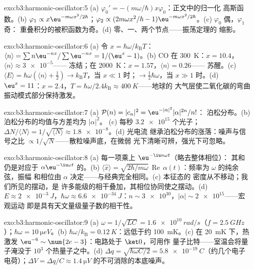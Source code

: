 \begin{solution}{exo:b3:harmonic-oscillator:5}
(a) $\varphi_0' = -(m\omega/\hbar)x\varphi_0$：正文中的归一化
高斯函数。(b) $\varphi_1 \propto x\eu^{-m\omega
x^2/2\hbar}$；$\varphi_2 \propto (2m\omega x^2/\hbar -
1)\eu^{-m\omega x^2/2\hbar}$。(c) $\varphi_0$ 偶，$\varphi_1$ 奇：
重叠积分的被积函数为奇。(d) 零、一、两个节点——振荡定理的
缩影。
\end{solution}

\begin{solution}{exo:b3:harmonic-oscillator:6}
(a) 令 $x = \hbar\omega/k_{\text{B}}T$：$\langle n\rangle =
\sum n\eu^{-nx}/\sum\eu^{-nx} = 1/(\eu^x - 1)$。(b) CO 在
\qty{300}{K}：$x = 10.4$，$\langle n\rangle \approx \num{3e-5}$——
冻结；在 \qty{2000}{K}：$x = 1.57$，$\langle n\rangle = 0.26$——
苏醒。(c) $\langle E\rangle = \hbar\omega(\langle n\rangle +
\tfrac12) \to k_{\text{B}}T$，当 $x \ll 1$ 时；$\to \tfrac12\hbar
\omega$，当 $x \gg 1$ 时。(d) $\eu^x = 11$：$x = 2.4$，$T =
\hbar\omega/2.4k_{\text{B}} \approx \qty{400}{K}$——地球的
大气层使二氧化碳的弯曲振动模式部分保持激发。
\end{solution}

\begin{solution}{exo:b3:harmonic-oscillator:7}
(a) $\mathcal P(n) = |c_n|^2 = \eu^{-|\alpha|^2}|\alpha|^{2n}/n!$：
泊松分布。(b) 泊松分布的均值与方差均为 $|\alpha|^2$。
(c) 每秒 $\num{3.2e15}$ 个光子；$\Delta N/\langle N\rangle =
1/\sqrt{\langle N\rangle} \approx \num{1.8e-8}$。(d) 光电流
继承泊松分布的涨落：噪声与信号之比
$\propto 1/\sqrt N$——散粒噪声底，在微弱
光下清晰可辨，强光下可忽略。
\end{solution}

\begin{solution}{exo:b3:harmonic-oscillator:8}
(a) 每一项乘上 $\eu^{-\iu n\omega t}$（略去整体相位）：
其和仍是对应于 $\alpha\eu^{-\iu\omega t}$ 的。(b)
$\langle\hat x\rangle = \sqrt{2\hbar/m\omega}\,
\operatorname{Re}\,\alpha(t)$：频率为 $\omega$ 的纯余弦，振幅
和相位由 $\alpha$ 决定——与经典完全相同。(c) 本征态的
密度从不移动；我们所见的摆动，是
许多能级的相干叠加，其相位协同使之摆动。(d) $E
\approx \qty{2e-3}{J}$，$\hbar\omega \approx \qty{6.6e-34}{J}$：$n
\sim \num{3e30}$，$|\alpha| \sim \num{2e15}$——宏观运动
即是具有天文量级量子数的相干性。
\end{solution}

\begin{solution}{exo:b3:harmonic-oscillator:9}
(a) $\omega = 1/\sqrt{LC} = \qty{1.6e10}{rad/s}$（$f =
\qty{2.5}{GHz}$）；$\hbar\omega = \qty{10}{\micro eV}$。(b)
$\hbar\omega/k_{\text{B}} = \qty{0.12}{K}$：远低于约
\qty{100}{mK}。(c) 在 \qty{20}{mK} 下，热激发
$\eu^{-6} \sim \num{2e-3}$：电路处于 $\ket0$，可用作
量子比特——室温会将量子淹没于 $10^3$
个热量子之中。(d) $\Delta q = \sqrt{\hbar\omega C/2} =
\qty{5.8e-19}{C}$（约几个电子电荷）；$\Delta V = \Delta q/C
\approx \qty{1.4}{\micro V}$ 的不可消除的本底噪声。
\end{solution}

